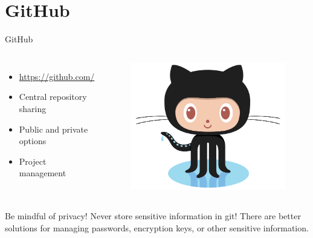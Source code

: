 \documentclass{beamer}
\begin{document}
    \section{GitHub}\label{sec:github}
    \begin{frame}{GitHub}
        \begin{columns}
            \begin{itemize}
                \item \url{https://github.com/}
                \item Central repository sharing
                \item Public and private options
                \item Project management
            \end{itemize}

            \begin{figure}
                \centering
                \includegraphics[width=\textwidth]{figures/Octocat.png}
            \end{figure}
        \end{columns}

        \begin{alertblock}{Be mindful of privacy!}
            Never store sensitive information in git! There are better solutions for managing passwords, encryption keys, or other sensitive information.
        \end{alertblock}
    \end{frame}
\end{document}

